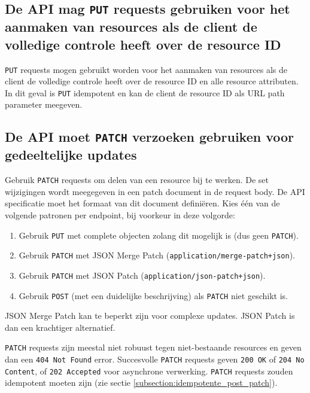 \subsection{De API mag \texttt{PUT} requests gebruiken voor het aanmaken van resources als de client de volledige controle heeft over de resource ID}
\label{subsection:put_voor_creatie}

\texttt{PUT} requests mogen gebruikt worden voor het aanmaken van resources als de client de volledige controle heeft over de resource ID en alle resource attributen. In dit geval is \texttt{PUT} idempotent en kan de client de resource ID als URL path parameter meegeven.

\subsection{De API moet \texttt{PATCH} verzoeken gebruiken voor gedeeltelijke updates}
\label{subsection:patch_requests}

Gebruik \texttt{PATCH} requests om delen van een resource bij te werken. De set wijzigingen wordt meegegeven in een patch document in de request body. De API specificatie moet het formaat van dit document definiëren. Kies één van de volgende patronen per endpoint, bij voorkeur in deze volgorde:

\begin{enumerate}
    \item Gebruik \texttt{PUT} met complete objecten zolang dit mogelijk is (dus geen \texttt{PATCH}).
    \item Gebruik \texttt{PATCH} met JSON Merge Patch (\texttt{application/merge-patch+json}).
    \item Gebruik \texttt{PATCH} met JSON Patch (\texttt{application/json-patch+json}).
    \item Gebruik \texttt{POST} (met een duidelijke beschrijving) als \texttt{PATCH} niet geschikt is.
\end{enumerate}

JSON Merge Patch kan te beperkt zijn voor complexe updates. JSON Patch is dan een krachtiger alternatief.

\texttt{PATCH} requests zijn meestal niet robuust tegen niet-bestaande resources en geven dan een \texttt{404 Not Found} error. Succesvolle \texttt{PATCH} requests geven \texttt{200 OK} of \texttt{204 No Content}, of \texttt{202 Accepted} voor asynchrone verwerking. \texttt{PATCH} requests zouden idempotent moeten zijn (zie sectie \ref{subsection:idempotente_post_patch}).


